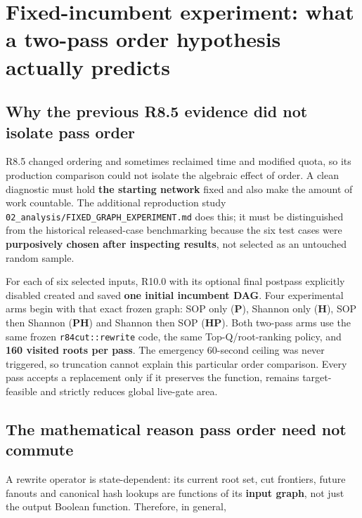 \section{Fixed-incumbent experiment: what a two-pass order hypothesis actually predicts}\label{fixed-incumbent-experiment-what-a-two-pass-order-hypothesis-actually-predicts}

\subsection{Why the previous R8.5 evidence did not isolate pass order}\label{why-the-previous-r8.5-evidence-did-not-isolate-pass-order}

R8.5 changed ordering and sometimes reclaimed time and modified quota, so its production comparison could not isolate the algebraic effect of order. A clean diagnostic must hold \textbf{the starting network} fixed and also make the amount of work countable. The additional reproduction study \texttt{02\_analysis/FIXED\_GRAPH\_EXPERIMENT.md} does this; it must be distinguished from the historical released-case benchmarking because the six test cases were \textbf{purposively chosen after inspecting results}, not selected as an untouched random sample.

For each of six selected inputs, R10.0 with its optional final postpass explicitly disabled created and saved \textbf{one initial incumbent DAG}. Four experimental arms begin with that exact frozen graph: SOP only (\textbf{P}), Shannon only (\textbf{H}), SOP then Shannon (\textbf{PH}) and Shannon then SOP (\textbf{HP}). Both two-pass arms use the same frozen \texttt{r84cut::rewrite} code, the same Top-Q/root-ranking policy, and \textbf{160 visited roots per pass}. The emergency 60-second ceiling was never triggered, so truncation cannot explain this particular order comparison. Every pass accepts a replacement only if it preserves the function, remains target-feasible and strictly reduces global live-gate area.

\subsection{The mathematical reason pass order need not commute}\label{the-mathematical-reason-pass-order-need-not-commute}

A rewrite operator is state-dependent: its current root set, cut frontiers, future fanouts and canonical hash lookups are functions of its \textbf{input graph}, not just the output Boolean function. Therefore, in general,

